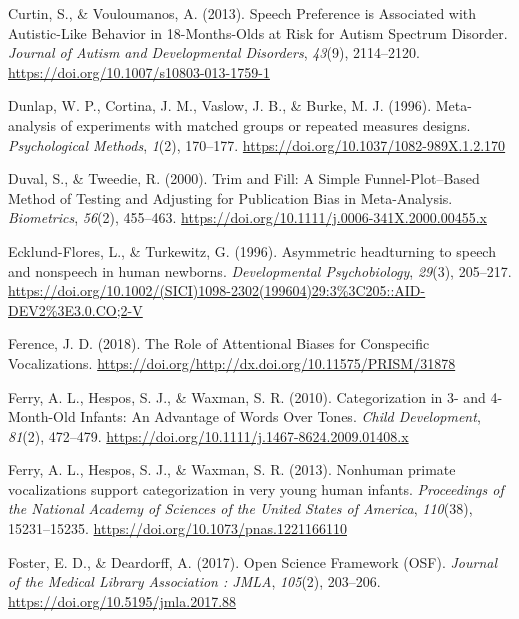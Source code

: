 \documentclass[
  man]{apa6}
\begin{document}
\leavevmode\hypertarget{ref-curtin_speech_2013}{}%
Curtin, S., \& Vouloumanos, A. (2013). Speech Preference is Associated with Autistic-Like Behavior in 18-Months-Olds at Risk for Autism Spectrum Disorder. \emph{Journal of Autism and Developmental Disorders}, \emph{43}(9), 2114--2120. \url{https://doi.org/10.1007/s10803-013-1759-1}

\leavevmode\hypertarget{ref-dunlap_meta-analysis_1996}{}%
Dunlap, W. P., Cortina, J. M., Vaslow, J. B., \& Burke, M. J. (1996). Meta-analysis of experiments with matched groups or repeated measures designs. \emph{Psychological Methods}, \emph{1}(2), 170--177. \url{https://doi.org/10.1037/1082-989X.1.2.170}

\leavevmode\hypertarget{ref-duval_trim_2000}{}%
Duval, S., \& Tweedie, R. (2000). Trim and Fill: A Simple Funnel-Plot--Based Method of Testing and Adjusting for Publication Bias in Meta-Analysis. \emph{Biometrics}, \emph{56}(2), 455--463. \url{https://doi.org/10.1111/j.0006-341X.2000.00455.x}

\leavevmode\hypertarget{ref-ecklund-flores_asymmetric_1996}{}%
Ecklund-Flores, L., \& Turkewitz, G. (1996). Asymmetric headturning to speech and nonspeech in human newborns. \emph{Developmental Psychobiology}, \emph{29}(3), 205--217. \url{https://doi.org/10.1002/(SICI)1098-2302(199604)29:3\%3C205::AID-DEV2\%3E3.0.CO;2-V}

\leavevmode\hypertarget{ref-ference_role_2018}{}%
Ference, J. D. (2018). The Role of Attentional Biases for Conspecific Vocalizations. \url{https://doi.org/http://dx.doi.org/10.11575/PRISM/31878}

\leavevmode\hypertarget{ref-ferry_categorization_2010}{}%
Ferry, A. L., Hespos, S. J., \& Waxman, S. R. (2010). Categorization in 3- and 4-Month-Old Infants: An Advantage of Words Over Tones. \emph{Child Development}, \emph{81}(2), 472--479. \url{https://doi.org/10.1111/j.1467-8624.2009.01408.x}

\leavevmode\hypertarget{ref-ferry_nonhuman_2013}{}%
Ferry, A. L., Hespos, S. J., \& Waxman, S. R. (2013). Nonhuman primate vocalizations support categorization in very young human infants. \emph{Proceedings of the National Academy of Sciences of the United States of America}, \emph{110}(38), 15231--15235. \url{https://doi.org/10.1073/pnas.1221166110}

\leavevmode\hypertarget{ref-foster_open_2017}{}%
Foster, E. D., \& Deardorff, A. (2017). Open Science Framework (OSF). \emph{Journal of the Medical Library Association : JMLA}, \emph{105}(2), 203--206. \url{https://doi.org/10.5195/jmla.2017.88}
\end{document}
